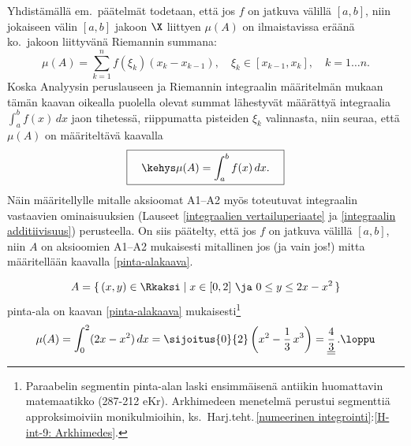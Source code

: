 Yhdistämällä em.\ päätelmät todetaan, että jos $f$ on jatkuva välillä $[a,b]$, niin jokaiseen
välin $[a,b]$ jakoon $\X$ liittyen $\mu(A)$ on ilmaistavissa eräänä ko.\ jakoon liittyvänä 
Riemannin summana:
\[
\mu(A) = \sum_{k=1}^n f(\xi_k)(x_k-x_{k-1}), \quad \xi_k\in[x_{k-1},x_k], \quad k = 1 \ldots n.
\]
Koska Analyysin peruslauseen ja Riemannin integraalin määritelmän mukaan tämän kaavan oikealla
puolella olevat summat lähestyvät määrättyä integraalia $\int_a^b f(x)\,dx$ jaon tihetessä,
riippumatta pisteiden $\xi_k$ valinnasta, niin seuraa, että $\mu(A)$ on määriteltävä kaavalla
\begin{equation} \label{pinta-alakaava}
\boxed{\quad\kehys \mu(A) = \int_a^b f(x)\,dx. \quad}
\end{equation}
Näin määritellylle mitalle aksioomat A1--A2 myös toteutuvat integraalin vastaavien
ominaisuuksien (Lauseet \ref{integraalien vertailuperiaate} ja \ref{integraalin additiivisuus})
perusteella. On siis päätelty, että jos $f$ on jatkuva välillä $[a,b]$, niin $A$ on aksioomien
A1--A2 mukaisesti mitallinen jos (ja vain jos!) mitta määritellään kaavalla
\eqref{pinta-alakaava}. 
\begin{Exa} \label{Arkhimedeen kaava}  
\[
A = \{\,(x,y) \in \Rkaksi \mid x\in[0,2]\ \ja\ 0 \le y \le 2x-x^2\,\}
\]
pinta-ala on kaavan \eqref{pinta-alakaava} mukaisesti\footnote[2]{Paraabelin segmentin
pinta-alan laski ensimmäisenä antiikin huomattavin matemaatikko 
(287-212 eKr). Arkhimedeen menetelmä perustui segmenttiä approksimoiviin monikulmioihin, ks.\
Harj.teht.\,\ref{numeerinen integrointi}:\ref{H-int-9: Arkhimedes}. }
\[
\mu(A) = \int_0^2 (2x-x^2)\,dx = \sijoitus{0}{2}\left(x^2-\frac{1}{3}\,x^3\right) 
                               = \underline{\underline{\frac{4}{3}}}\,. \loppu
\]
\end{Exa}

